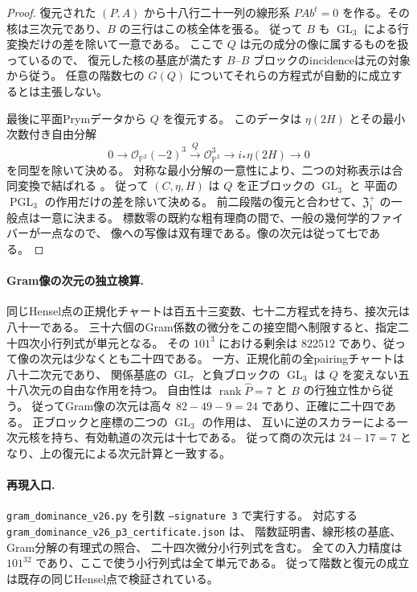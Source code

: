 \begin{proof}
復元された $(P,A)$ から十八行二十一列の線形系
$PAb^t=0$ を作る。その核は三次元であり、$B$ の三行はこの核全体を張る。
従って $B$ も $\operatorname{GL}_3$ による行変換だけの差を除いて一意である。
ここで $Q$ は元の成分の像に属するものを扱っているので、
復元した核の基底が満たす $B$--$B$ ブロックのincidenceは元の対象から従う。
任意の階数七の $G(Q)$ についてそれらの方程式が自動的に成立するとは主張しない。

最後に平面Prymデータから $Q$ を復元する。
このデータは $\eta(2H)$ とその最小次数付き自由分解
\[
 0\longrightarrow\mathcal O_{\mathbb P^2}(-2)^3
 \xrightarrow{Q}\mathcal O_{\mathbb P^2}^{3}
 \longrightarrow i_*\eta(2H)\longrightarrow0
\]
を同型を除いて決める。
対称な最小分解の一意性により、二つの対称表示は合同変換で結ばれる
\cite[\S2.3]{BeauvilleDeterminantal}。
従って $(C,\eta,H)$ は $Q$ を正ブロックの $\operatorname{GL}_3$ と
平面の $\operatorname{PGL}_3$ の作用だけの差を除いて決める。
前二段階の復元と合わせて、$\mathfrak Z_1^+$ の一般点は一意に決まる。
標数零の既約な粗有理商の間で、一般の幾何学的ファイバーが一点なので、
像への写像は双有理である。像の次元は従って七である。

\end{proof}

\paragraph{Gram像の次元の独立検算.}
同じHensel点の正規化チャートは百五十三変数、七十二方程式を持ち、接次元は八十一である。
三十六個のGram係数の微分をこの接空間へ制限すると、指定二十四次小行列式が単元となる。
その $101^3$ における剰余は $822512$ であり、従って像の次元は少なくとも二十四である。
一方、正規化前の全pairingチャートは八十二次元であり、
関係基底の $\operatorname{GL}_7$ と負ブロックの $\operatorname{GL}_3$ は
$Q$ を変えない五十八次元の自由な作用を持つ。
自由性は $\operatorname{rank}\widehat P=7$ と $B$ の行独立性から従う。
従ってGram像の次元は高々 $82-49-9=24$ であり、正確に二十四である。
正ブロックと座標の二つの $\operatorname{GL}_3$ の作用は、
互いに逆のスカラーによる一次元核を持ち、有効軌道の次元は十七である。
従って商の次元は $24-17=7$ となり、上の復元による次元計算と一致する。

\paragraph{再現入口.}
\nolinkurl{gram_dominance_v26.py} を引数 \texttt{--signature 3} で実行する。
対応する \nolinkurl{gram_dominance_v26_p3_certificate.json} は、
階数証明書、線形核の基底、Gram分解の有理式の照合、
二十四次微分小行列式を含む。
全ての入力精度は $101^{32}$ であり、ここで使う小行列式は全て単元である。
従って階数と復元の成立は既存の同じHensel点で検証されている。
